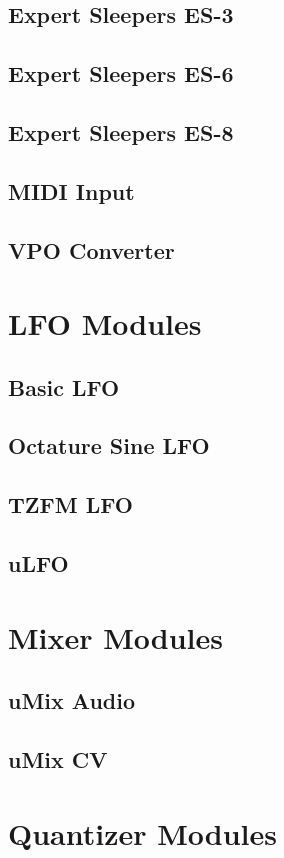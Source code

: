 \documentclass[11pt]{book}
\begin{document}
\section{Expert Sleepers ES-3}
\section{Expert Sleepers ES-6}
\section{Expert Sleepers ES-8}
\section{MIDI Input}
\section{VPO Converter}

\chapter{LFO Modules}
\section{Basic LFO}
\section{Octature Sine LFO}
\section{TZFM LFO}
\section{uLFO}

\chapter{Mixer Modules}
\section{uMix Audio}
\section{uMix CV}

\chapter{Quantizer Modules}
\end{document}
